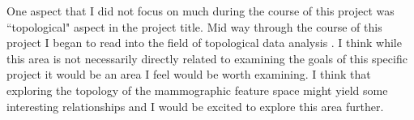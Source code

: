 One aspect that I did not focus on much during the course of this project was ``topological" aspect in the project title. Mid way through the course of this project I began to read into the field of topological data analysis \cite{carlsson2009topology}. I think while this area is not necessarily directly related to examining the goals of this specific project it would be an area I feel would be worth examining. I think that exploring the topology of the mammographic feature space might yield some interesting relationships and I would be excited to explore this area further.

 